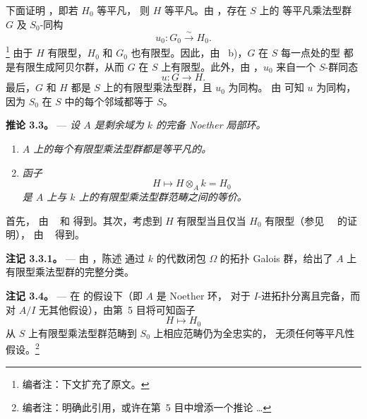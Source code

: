 下面证明 ，即若 \(H_0\) 等平凡，
则 \(H\) 等平凡。由 ，存在 \(S\) 上的
等平凡乘法型群 \(G\) 及 \(S_0\)-同构
\[
  u_0:G_0\xrightarrow{\sim}H_0.
\]
\footnote{编者注：下文扩充了原文。}
由于 \(H\) 有限型，\(H_0\) 和 \(G_0\) 也有限型。因此，由
~b)，\(G\) 在 \(S\) 每一点处的型
都是有限生成阿贝尔群，从而 \(G\) 在 \(S\) 上有限型。此外，由
，\(u_0\) 来自一个 \(S\)-群同态
\[
  u:G\longrightarrow H.
\]
最后，\(G\) 和 \(H\) 都是 \(S\) 上的有限型乘法型群，且 \(u_0\) 为同构。
由  可知 \(u\) 为同构，因为
\(S_0\) 在 \(S\) 中的每个邻域都等于 \(S\)。

\medskip
\noindent{}%
\textbf{推论 3.3。} ---
\textit{设 \(A\) 是剩余域为 \(k\) 的完备 Noether 局部环。}
\begin{enumerate}
\item[\SGAInlineRefTarget{sga3:x:corollary:3:3:item:i}(i)]\textit{\(A\) 上的每个有限型乘法型群都是等平凡的。}
\item[(ii)]\textit{函子
\[
  H\longmapsto H\otimes_A k=H_0
\]
是 \(A\) 上与 \(k\) 上的有限型乘法型群范畴之间的等价。}
\end{enumerate}

\footnotemark[12]
首先， 由
~ 和
 得到。其次，考虑到 \(H\) 有限型当且仅当
\(H_0\) 有限型（参见\ ~ 的证明），
 由
~ 得到。

\medskip
\noindent{}%
\textbf{注记 3.3.1。} ---
由 ，陈述
 通过 \(k\) 的代数闭包 \(\Omega\) 的拓扑
Galois 群，给出了 \(A\) 上有限型乘法型群的完整分类。

\medskip
\noindent{}%
\textbf{注记 3.4。} ---
在  的假设下（即 \(A\) 是 Noether 环，
对于 \(I\)-进拓扑分离且完备，而对 \(A/I\) 无其他假设），由第~5 目将可知函子
\[
  H\longmapsto H_0
\]
从 \(S\) 上有限型乘法型群范畴到 \(S_0\) 上相应范畴仍为全忠实的，
无须任何等平凡性假设。\footnote{编者注：明确此引用，或许在第~5 目中增添一个推论 \ldots}

